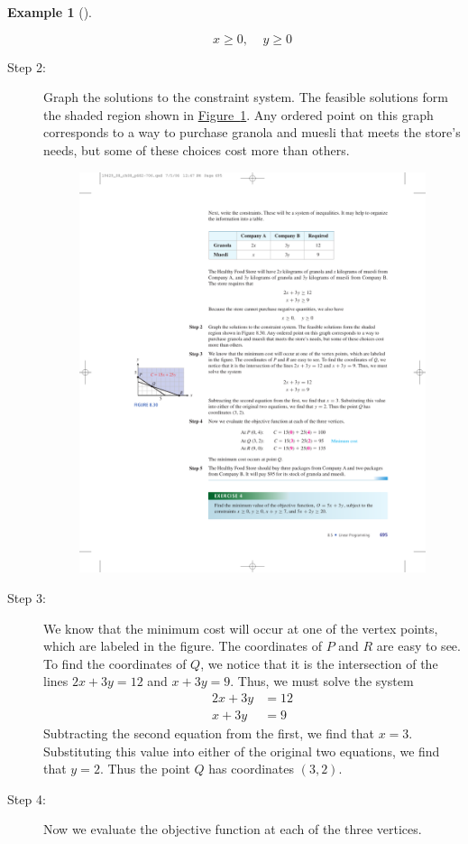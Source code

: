 \documentclass[10pt,]{book}
\theoremstyle{plain}
\theoremstyle{definition}
\theoremstyle{definition}
\newtheorem{example}[theorem]{Example}
\theoremstyle{definition}
\numberwithin{equation}{part}
\newcommand{\amp}{&}
\begin{document}
\begin{example}[]
\begin{description}
\begin{equation*}
x \ge 0, ~~~~~y \ge 0
\end{equation*}
%
\item[{Step 2:}]\hypertarget{li-35}{}Graph the solutions to the constraint system. The feasible solutions form the shaded region shown in \hyperref[fig-unbounded-feasible-set]{Figure~\ref{fig-unbounded-feasible-set}}. Any ordered point on this graph corresponds to a way to purchase granola and muesli that meets the store’s needs, but some of these choices cost more than others. \leavevmode%
\begin{figure}
\centering
\includegraphics[width=0.6\linewidth]{images/fig-unbounded-feasible-set}
\caption{\label{fig-unbounded-feasible-set}}
\end{figure}
%
\item[{Step 3:}]\hypertarget{li-36}{}We know that the minimum cost will occur at one of the vertex points, which are labeled in the figure. The coordinates of \(P\) and \(R\) are easy to see. To find the coordinates of \(Q\), we notice that it is the intersection of the lines \(2x + 3y = 12\) and \(x + 3y = 9\). Thus, we must solve the system%
\begin{align*}
2x + 3y \amp= 12\\
x + 3y \amp = 9
\end{align*}
Subtracting the second equation from the first, we find that \(x=3\). Substituting this value into either of the original two equations, we find that \(y=2\). Thus the point \(Q\) has coordinates \((3, 2)\).%
\item[{Step 4:}]\hypertarget{li-37}{}Now we evaluate the objective function at each of the three vertices.%
\begin{align*}

\end{align*}
\end{description}
\end{example}
\end{document}
